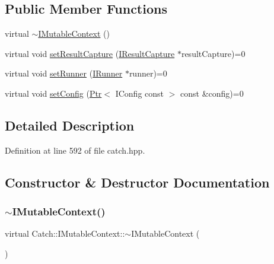 \subsection*{Public Member Functions}
\begin{DoxyCompactItemize}
\item 
virtual \hyperlink{struct_catch_1_1_i_mutable_context_a93f32b2ab6d0fb83637059240be799ab}{$\sim$\+I\+Mutable\+Context} ()
\item 
virtual void \hyperlink{struct_catch_1_1_i_mutable_context_a4a80afd0525b7def21bee8d9b48f2d39}{set\+Result\+Capture} (\hyperlink{struct_catch_1_1_i_result_capture}{I\+Result\+Capture} $\ast$result\+Capture)=0
\item 
virtual void \hyperlink{struct_catch_1_1_i_mutable_context_af2e53b1dea4527a2587cff266a730f6e}{set\+Runner} (\hyperlink{struct_catch_1_1_i_runner}{I\+Runner} $\ast$runner)=0
\item 
virtual void \hyperlink{struct_catch_1_1_i_mutable_context_a013e8f688a8ea7970262d07ead542a63}{set\+Config} (\hyperlink{class_catch_1_1_ptr}{Ptr}$<$ I\+Config const $>$ const \&config)=0
\end{DoxyCompactItemize}


\subsection{Detailed Description}


Definition at line 592 of file catch.\+hpp.



\subsection{Constructor \& Destructor Documentation}
\hypertarget{struct_catch_1_1_i_mutable_context_a93f32b2ab6d0fb83637059240be799ab}{}\label{struct_catch_1_1_i_mutable_context_a93f32b2ab6d0fb83637059240be799ab} 
\subsubsection{\texorpdfstring{$\sim$\+I\+Mutable\+Context()}{~IMutableContext()}}
{\footnotesize\ttfamily virtual Catch\+::\+I\+Mutable\+Context\+::$\sim$\+I\+Mutable\+Context (\begin{DoxyParamCaption}{ }\end{DoxyParamCaption})\hspace{0.3cm}{\ttfamily [virtual]}}



